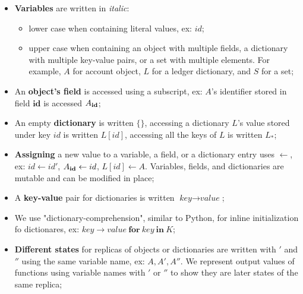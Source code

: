 \documentclass[9pt, oneside]{article}   	%
\begin{document}
\begin{itemize}
	\item \textbf{Variables} are written in \textit{italic}:
		\begin{itemize}
			\item  lower case when containing literal values, ex: $id$;
			\item upper case when containing an object with multiple fields, a dictionary with multiple key-value pairs, or a set with multiple elements. For example, $A$ for account object, $L$ for a ledger dictionary, and $S$ for a set;
		\end{itemize}
	\item An \textbf{object's field} is accessed using a subscript, ex: $A$'s identifier stored in field $\textbf{id}$ is accessed $A_{\scriptsize \textbf{id}}$;
	\item An empty \textbf{dictionary} is written $\{\}$, accessing a dictionary $L$'s value stored under key $id$ is written $L[id]$, accessing all the keys of $L$ is written $L_*$;
	\item \textbf{Assigning} a new value to a variable, a field, or a dictionary entry uses $\leftarrow$, ex: $id \leftarrow id'$, $A_{\scriptsize\textbf{id}} \leftarrow id$, $L[id] \leftarrow A$. Variables, fields, and dictionaries are mutable and can be modified in place;
	 \item A \textbf{key-value} pair for dictionaries is written $\textit{key} \rightarrow \textit{value}$;
	 \item We use "dictionary-comprehension", similar to Python, for inline initialization fo dictionares, ex: ${ \textit{key} \rightarrow \textit{value} ~\textbf{for}~ \textit{key} ~\textbf{in}~ K }$;
	\item \textbf{Different states} for replicas of objects or dictionaries are written with $'$ and $''$ using the same variable name, ex: $A, A', A''$. We represent output values of functions using variable names with $'$ or $''$ to show they are later states of the same replica;
\end{itemize}
\end{document}
